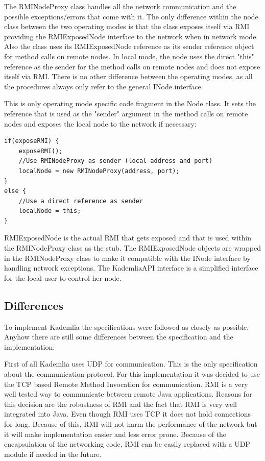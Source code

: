 \documentclass[a4paper, 12pt]{article} %
\begin{document}
The RMINodeProxy class handles all the network communication and the possible exceptions/errors that come with it. The only difference within the node class between the two operating modes is that the class exposes itself via RMI providing the RMIExposedNode interface to the network when in network mode. Also the class uses its RMIExposedNode reference as its sender reference object for method calls on remote nodes. In local mode, the node uses the direct "this" reference as the sender for the method calls on remote nodes and does not expose itself via RMI. There is no other difference between the operating modes, as all the procedures always only refer to the general INode interface.

This is only operating mode specific code fragment in the Node class. It sets the reference that is used as the "sender" argument in the method calls on remote nodes and exposes the local node to the network if necessary:

\begin{verbatim}
if(exposeRMI) {
    exposeRMI();
    //Use RMINodeProxy as sender (local address and port)
    localNode = new RMINodeProxy(address, port);
}
else {
    //Use a direct reference as sender
    localNode = this;
}
\end{verbatim}

RMIExposedNode is the actual RMI that gets exposed and that is used within the RMINodeProxy class as the stub. The RMIExposedNode objects are wrapped in the RMINodeProxy class to make it compatible with the INode interface by handling network exceptions. The KademliaAPI interface is a simplified interface for the local user to control her node.

\subsection{Differences}

To implement Kademlia the specifications were followed as closely as possible. Anyhow there are still some differences between the specification and the implementation:

First of all Kademlia uses UDP for communication. This is the only specification about the communication protocol. For this implementation it was decided to use the TCP based Remote Method Invocation for communication. RMI is a very well tested way to communicate between remote Java applications. Reasons for this decision are the robustness of RMI and the fact that RMI is very well integrated into Java. Even though RMI uses TCP it does not hold connections for long. Because of this, RMI will not harm the performance of the network but it will make implementation easier and less error prone. Because of the encapsulation of the networking code, RMI can be easily replaced with a UDP module if needed in the future.
\end{document}

